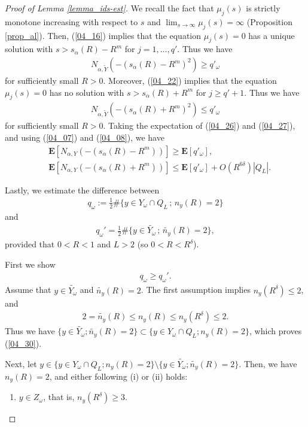 \documentclass[12pt,a4paper]{article}
\begin{document}
\begin{proof}[Proof of Lemma \ref{lemma_ids-est}]
We recall the fact that 
$\mu_j(s)$ is strictly monotone increasing with respect to $s$
and $\displaystyle\lim_{s\to \infty}\mu_j(s)=\infty$
(Proposition \ref{prop_al}).
Then, (\ref{04_16}) implies that
the equation $\mu_j(s)=0$ has a unique solution with $s>s_\alpha(R)-R^m$
for $j=1,\ldots,q'$.
Thus we have
\begin{align}
\label{04_26}
 N_{\alpha,\widetilde{Y}}(-(s_\alpha(R)-R^m)^2)\geq q'_\omega
\end{align}
for sufficiently small $R>0$.
Moreover, (\ref{04_22}) implies that
the equation $\mu_j(s)=0$ has no solution with $s>s_\alpha(R)+R^m$
for $j\geq q'+1$.
Thus we have
\begin{align}
\label{04_27}
 N_{\alpha,\widetilde{Y}}(-(s_\alpha(R)+R^m)^2)\leq q'_\omega
\end{align}
for sufficiently small $R>0$.
Taking the expectation of (\ref{04_26}) and (\ref{04_27}),
and using (\ref{04_07}) and (\ref{04_08}),
we have
\begin{align}
&\   
\mathbf{E}[N_{\alpha,Y}(-(s_\alpha(R)-R^m))]
\geq 
\mathbf{E}[q'_\omega],
\label{04_28}
\\
&\ 
\mathbf{E}[N_{\alpha,Y}(-(s_\alpha(R)+R^m))]
\leq 
\mathbf{E}[q'_\omega]+O(R^{6\delta})|Q_L|.
\label{04_29}
\end{align}

Lastly, we estimate the difference between
\begin{align*}
 q_\omega := 
\frac{1}{2}
\#\{y \in Y_\omega \cap Q_L \,;\, n_y(R)=2\}
\end{align*}
and 
\begin{align*}
 q_\omega' = 
\frac{1}{2}
\#\{y \in \widetilde{Y_\omega} \,;\, \widetilde{n_y}(R)=2\},
\end{align*}
provided that $0<R<1$ and $L>2$ (so $0<R<R^\delta$).

First we show
\begin{align}
 \label{04_30}
 q_\omega\geq q_\omega'.
\end{align}
Assume that $y\in \widetilde{Y_\omega}$ and $\widetilde{n_y}(R)=2$.
The first assumption  implies $n_y(R^\delta)\leq 2$, and
\begin{align*}
 2=\widetilde{n_y}(R)\leq n_y(R)\leq n_y(R^\delta) \leq 2.
\end{align*}
Thus we have 
$\{y\in \widetilde{Y_\omega};\widetilde{n_y}(R)=2\}\subset\{y\in Y_\omega\cap Q_L;n_y(R)=2\}$,
which proves (\ref{04_30}).


Next,
let $y\in \{y\in Y_\omega\cap Q_L;n_y(R)=2\}\setminus \{y\in \widetilde{Y_\omega};\widetilde{n_y}(R)=2\}$.
Then, we have
$n_y(R)=2$, and either following (i) or (ii) holds:
\begin{enumerate}
 \item[(i)] $y\in Z_\omega$, that is, $n_y(R^\delta)\geq 3$.


\end{enumerate}
\end{proof}
\end{document}
